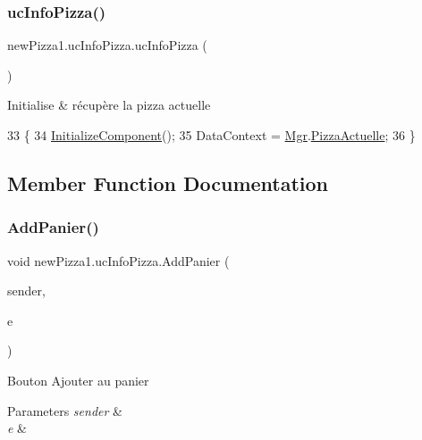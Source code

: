 \subsubsection{\texorpdfstring{uc\+Info\+Pizza()}{ucInfoPizza()}}
{\footnotesize\ttfamily new\+Pizza1.\+uc\+Info\+Pizza.\+uc\+Info\+Pizza (\begin{DoxyParamCaption}{ }\end{DoxyParamCaption})\hspace{0.3cm}{\ttfamily [inline]}}



Initialise \& récupère la pizza actuelle 


\begin{DoxyCode}
33         \{
34             \hyperlink{classnewPizza1_1_1ucInfoPizza_a5d6e37c02a381d24941d4f45b4a21dbe}{InitializeComponent}();
35             DataContext = \hyperlink{classnewPizza1_1_1ucInfoPizza_ade399f2ed146dd3b5b0a4784a8670652}{Mgr}.\hyperlink{classModele_1_1Manager_a7e69844aeeebbc80144850efc0d2b94c}{PizzaActuelle};
36         \}
\end{DoxyCode}


\subsection{Member Function Documentation}
\mbox{\label{classnewPizza1_1_1ucInfoPizza_a5787ca97276bd3d501d9a8c029ad25ec}} 
\subsubsection{\texorpdfstring{Add\+Panier()}{AddPanier()}}
{\footnotesize\ttfamily void new\+Pizza1.\+uc\+Info\+Pizza.\+Add\+Panier (\begin{DoxyParamCaption}\item[{object}]{sender,  }\item[{Routed\+Event\+Args}]{e }\end{DoxyParamCaption})\hspace{0.3cm}{\ttfamily [inline]}}



Bouton Ajouter au panier 


\begin{DoxyParams}{Parameters}
{\em sender} & \\
\hline
{\em e} & \\
\hline
\end{DoxyParams}

